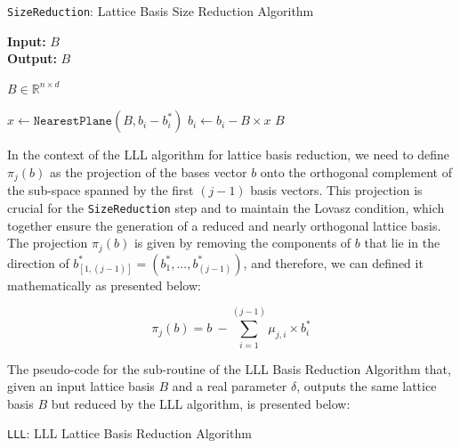 \documentclass[runningheads]{llncs}
\numberwithin{equation}{section}
\begin{document}
\begin{enumerate}
        \vspace{-2ex}
        \begin{algorithm}
            \caption{\texorpdfstring{\texttt{SizeReduction}}\/: Lattice Basis Size Reduction Algorithm}
            \label{subrou:lattice-basis-size-reduction-algorithm}
            
            \textbf{Input:} $ B $\\
            \textbf{Output:} $ B $
            
            \begin{algorithmic}[1]
                \Ensure $B \in {\mathbb{R}}^{n \times d}$
            
                \vspace{2ex}

                    \State $x \gets \texttt{NearestPlane}(B, {b}_{i} - {b}^{*}_{i})$
                    \State ${b}_{i} \gets {b}_{i} - B \times x$
                \EndFor
                \State \Return $B$
            \end{algorithmic}
        \end{algorithm}

        In the context of the LLL algorithm for lattice basis reduction, we need to define ${\pi}_{j}(b)$ as the projection of the bases vector $b$ onto the orthogonal complement of the sub-space spanned by the first $(j - 1)$ basis vectors. This projection is crucial for the \texttt{SizeReduction} step and to maintain the Lovasz condition, which together ensure the generation of a reduced and nearly orthogonal lattice basis. The projection ${\pi}_{j}(b)$ is given by removing the components of $b$ that lie in the direction of ${b}^{*}_{[1,(j - 1)]} = ({b}^{*}_{1}, ..., {b}^{*}_{(j - 1)})$, and therefore, we can defined it mathematically as presented below:

        $$ {\pi}_{j}(b) = b\ - \sum_{i = 1}^{(j - 1)} {\mu}_{j,i} \times {b}^{*}_{i} $$

        \clearpage
        
        The pseudo-code for the sub-routine of the LLL Basis Reduction Algorithm that, given an input lattice basis $B$ and a real parameter $\delta$, outputs the same lattice basis $B$ but reduced by the LLL algorithm, is presented below:

        \vspace{-2ex}
        \setcounter{algorithm}{0}
        \begin{algorithm}
            \caption{\texorpdfstring{\texttt{LLL}}\/: LLL Lattice Basis Reduction Algorithm}
            \label{subrou:lll-lattice-basis-reduction-algorithm}
            

\end{algorithm}
\end{enumerate}
\end{document}
